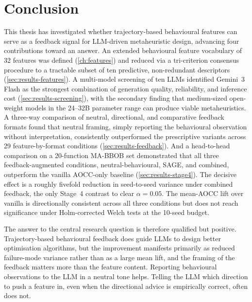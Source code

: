 
\chapter{Conclusion}
\label{ch:conclusion}

This thesis has investigated whether trajectory-based behavioural features can serve as a feedback signal for LLM-driven metaheuristic design, advancing four contributions toward an answer. An extended behavioural feature vocabulary of 32 features was defined (\cref{ch:features}) and reduced via a tri-criterion consensus procedure to a tractable subset of ten predictive, non-redundant descriptors (\cref{sec:results-features}). A multi-model screening of ten LLMs identified Gemini~3 Flash as the strongest combination of generation quality, reliability, and inference cost (\cref{sec:results-screening}), with the secondary finding that medium-sized open-weight models in the 24--32B parameter range can produce viable metaheuristics. A three-way comparison of neutral, directional, and comparative feedback formats found that neutral framing, simply reporting the behavioural observation without interpretation, consistently outperformed the prescriptive variants across 29 feature-by-format conditions (\cref{sec:results-feedback}). And a head-to-head comparison on a 20-function MA-BBOB set demonstrated that all three feedback-augmented conditions, neutral-behavioural, SAGE, and combined, outperform the vanilla AOCC-only baseline (\cref{sec:results-stage4}). The decisive effect is a roughly fivefold reduction in seed-to-seed variance under combined feedback, the only Stage~4 contrast to clear $\alpha = 0.05$. The mean-AOCC lift over vanilla is directionally consistent across all three conditions but does not reach significance under Holm-corrected Welch tests at the 10-seed budget.

The answer to the central research question is therefore qualified but positive. Trajectory-based behavioural feedback does guide LLMs to design better optimisation algorithms, but the improvement manifests primarily as reduced failure-mode variance rather than as a large mean lift, and the framing of the feedback matters more than the feature content. Reporting behavioural observations to the LLM in a neutral tone helps. Telling the LLM which direction to push a feature in, even when the directional advice is empirically correct, often does not.

